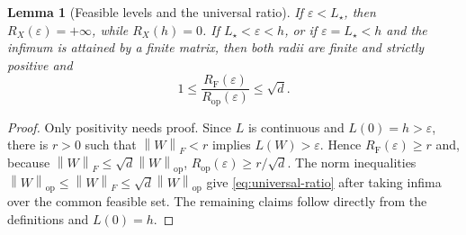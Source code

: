 \documentclass[11pt]{article}
\newtheorem{lemma}[lemma]{Lemma}
\theoremstyle{definition}
\newcommand{\normF}[1]{\left\lVert #1\right\rVert_F}
\newcommand{\normop}[1]{\left\lVert #1\right\rVert_{\mathrm{op}}}
\newcommand{\RF}{R_{\mathrm F}}
\newcommand{\Rop}{R_{\mathrm{op}}}
\newcommand{\eps}{\varepsilon}
\begin{document}
\begin{lemma}[Feasible levels and the universal ratio]
\label{lem:feasible}
If $\eps<L_\star$, then $R_X(\eps)=+\infty$, while $R_X(h)=0$.  If
$L_\star<\eps<h$, or if $\eps=L_\star<h$ and the infimum is attained by
a finite matrix, then both radii are finite and strictly positive and
\begin{equation}
 1\leq \frac{\RF(\eps)}{\Rop(\eps)}\leq\sqrt d.
 \label{eq:universal-ratio}
\end{equation}
\end{lemma}

\begin{proof}
Only positivity needs proof.  Since $L$ is continuous and $L(0)=h>\eps$,
there is $r>0$ such that $\normF{W}<r$ implies $L(W)>\eps$.  Hence
$\RF(\eps)\geq r$ and, because $\normF{W}\leq\sqrt d\normop{W}$,
$\Rop(\eps)\geq r/\sqrt d$.  The norm inequalities
$\normop{W}\leq\normF{W}\leq\sqrt d\normop{W}$ give
\eqref{eq:universal-ratio} after taking infima over the common feasible
set.  The remaining claims follow directly from the definitions and
$L(0)=h$.
\end{proof}
\end{document}
